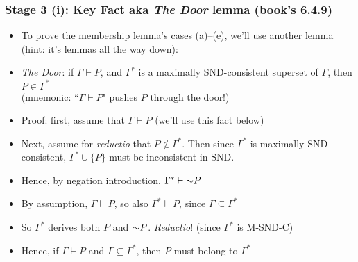 \begin{frame}
\frametitle{Stage 3 (i): Key Fact aka \emph{The Door} lemma (book's 6.4.9)}

\begin{itemize}[<+->]

\item To prove the membership lemma's cases (a)--(e), we'll use another lemma (hint: it's lemmas all the way down):

\item \emph{The Door}: if $\Gamma \vdash P$, and $\Gamma^{\ast}$ is a maximally SND-consistent superset of $\Gamma$, then $P \in \Gamma^{\ast}$ \\ (mnemonic: ``$\Gamma\vdash P$" pushes $P$ through the door!) %

\item Proof: first, assume that $\Gamma \vdash P$ (we'll use this fact below)

\item Next, assume for \textit{reductio} that $P \notin \Gamma^{\ast}$. Then since $\Gamma^{\ast}$ is maximally SND-consistent, $\Gamma^{\ast} \cup \{ P\}$ must be \textcolor{OGlyallpink}{inconsistent in SND}. 

\item Hence, by negation introduction, $\Gamma^{\ast} \vdash \enot P$

\item By assumption, $\Gamma \vdash P$, so also $\Gamma^{\ast} \vdash P$, since $\Gamma \subseteq \Gamma^{\ast}$

\item So $\Gamma^{\ast}$ derives both $P$ and $\enot P$. \textit{Reductio}! (since $\Gamma^{\ast}$ is M-SND-C)

\item Hence, if $\Gamma \vdash P$ and $\Gamma \subseteq \Gamma^{\ast}$, then $P$ must belong to $\Gamma^{\ast}$ 

\end{itemize}
\end{frame}




